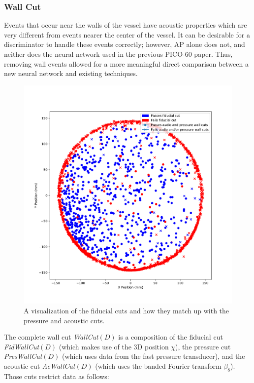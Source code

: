 \documentclass[10pt]{article}
\begin{document}
\subsubsection{Wall Cut} \label{wall_cut}

Events that occur near the walls of the vessel have acoustic properties which are very different from events nearer the center of the vessel. It can be desirable for a discriminator to handle these events correctly; however, AP alone does not, and neither does the neural network used in the previous PICO-60 paper. Thus, removing wall events allowed for a more meaningful direct comparison between a new neural network and existing techniques.

\begin{figure}[h!]
    \centering
    \includegraphics[width=\textwidth]{wall_event_positions}
    \caption{\label{wall_cuts_visualization} A visualization of the fiducial cuts and how they match up with the pressure and acoustic cuts.}
\end{figure}

The complete wall cut {\it WallCut}$(D)$ is a composition of the fiducial cut {\it FidWallCut}$(D)$ (which makes use of the 3D position $\chi$), the pressure cut {\it PresWallCut}$(D)$ (which uses data from the fast pressure transducer), and the acoustic cut {\it AcWallCut}$(D)$ (which uses the banded Fourier transform $\beta _{8}$). Those cuts restrict data as follows:
\end{document}
